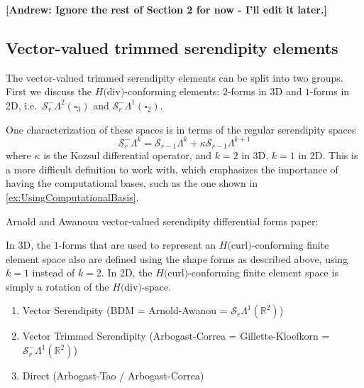 \documentclass[manuscript,screen]{acmart}
\newcommand{\R}{\mathbb{R}}
\newcommand\akg[1]{\textbf{\textcolor[rgb]{.5,0,1}{[Andrew: #1]}}}
\newcommand{\calS}{\mathcal{S}}
\newcommand{\hcurl}{$H($curl$)$}
\newcommand{\hdiv}{$H($div$)$}
\begin{document}
\akg{Ignore the rest of Section 2 for now - I'll edit it later.}  
  \subsection{Vector-valued trimmed serendipity elements}

  The vector-valued trimmed serendipity elements  can be split into two groups.  First we discuss the \hdiv-conforming elements: $2$-forms in 3D and $1$-forms in 2D, i.e.\ $\calS_r^-\Lambda^2(\square_3)$ and $\calS_r^-\Lambda^1(\square_2)$.  
  
  One characterization of these spaces is in terms of the regular serendipity spaces
  \begin{equation*}
      \calS_r^-\Lambda^k = \calS_{r-1}\Lambda^k + \kappa \calS_{r-1}\Lambda^{k+1}
  \end{equation*}
  where $\kappa$ is the Kozsul differential operator, and $k=2$ in 3D, $k=1$ in 2D.  This is a more difficult definition to work with, which emphasizes the importance of having the computational bases, such as the one shown in \ref{ex:UsingComputationalBasis}.  
  
  Arnold and Awanouu vector-valued serendipity differential forms paper:~\cite{AA2014}  
    
  In 3D, the $1$-forms that are used to represent an \hcurl-conforming finite element space also are defined using the shape forms as described above, using $k=1$ instead of $k=2$.  In 2D, the \hcurl-conforming finite element space is simply a rotation of the \hdiv-space.  
  
  
  
  
  \begin{enumerate}
  \item Vector Serendipity (BDM = Arnold-Awanou = $\calS_r\Lambda^1(\R^2)$)
  \item Vector Trimmed Serendipity (Arbogast-Correa = Gillette-Kloefkorn = $\calS_r^-\Lambda^1(\R^2)$)
  \item Direct (Arbogast-Tao / Arbogast-Correa)  
  \end{enumerate}
  
\end{document}
